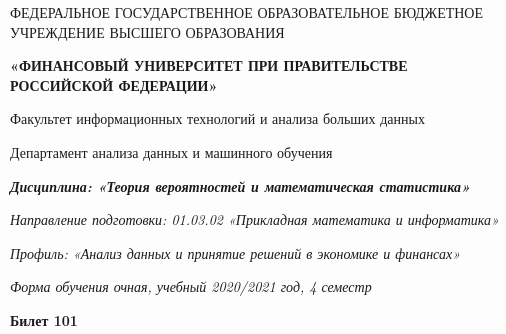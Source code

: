 \documentclass[a4paper,14pt]{article}
\begin{document}
\begin{center}
ФЕДЕРАЛЬНОЕ ГОСУДАРСТВЕННОЕ ОБРАЗОВАТЕЛЬНОЕ БЮДЖЕТНОЕ УЧРЕЖДЕНИЕ ВЫСШЕГО ОБРАЗОВАНИЯ

    \textbf{«ФИНАНСОВЫЙ УНИВЕРСИТЕТ ПРИ ПРАВИТЕЛЬСТВЕ РОССИЙСКОЙ ФЕДЕРАЦИИ»}

Факультет информационных технологий и анализа больших данных

Департамент анализа данных и машинного обучения

\textit{
	\textbf{Дисциплина: «Теория вероятностей и математическая статистика»}}

\textit{Направление подготовки: 01.03.02 «Прикладная математика и информатика»}

\textit{Профиль: «Анализ данных и принятие решений в экономике и финансах»}

\textit{Форма обучения очная, учебный 2020/2021 год, 4 семестр}

\textbf{Билет 101}

\end{center}
\end{document}
